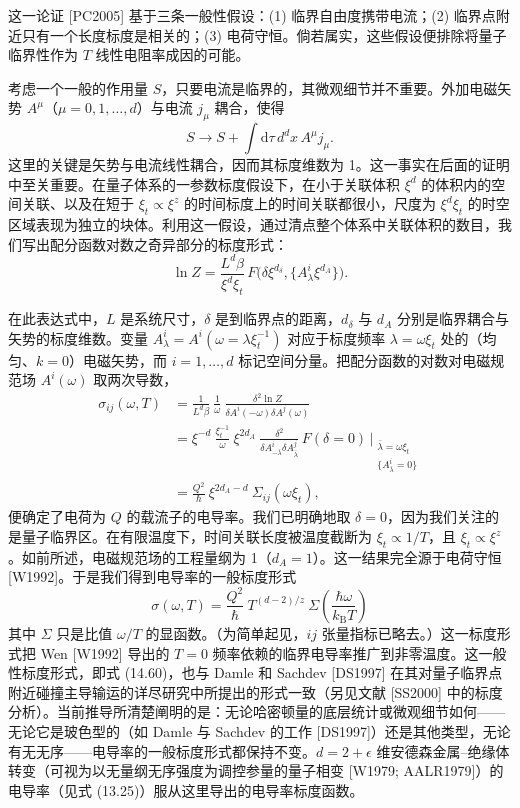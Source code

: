 这一论证 [PC2005] 基于三条一般性假设：(1) 临界自由度携带电流；(2) 临界点附近只有一个长度标度是相关的；(3) 电荷守恒。倘若属实，这些假设便排除将量子临界性作为 $T$ 线性电阻率成因的可能。

考虑一个一般的作用量 $S$，只要电流是临界的，其微观细节并不重要。外加电磁矢势 $A^{\mu}$（$\mu=0,1,\ldots,d$）与电流 $j_{\mu}$ 耦合，使得
\begin{equation*}
S\to S+\int \mathrm{d}\tau\, d^{d}x\, A^{\mu}j_{\mu}.\tag{14.57}
\end{equation*}
这里的关键是矢势与电流线性耦合，因而其标度维数为 1。这一事实在后面的证明中至关重要。在量子体系的一参数标度假设下，在小于关联体积 $\xi^{d}$ 的体积内的空间关联、以及在短于 $\xi_{t}\propto\xi^{z}$ 的时间标度上的时间关联都很小，尺度为 $\xi^{d}\xi_{t}$ 的时空区域表现为独立的块体。利用这一假设，通过清点整个体系中关联体积的数目，我们写出配分函数对数之奇异部分的标度形式：
\begin{equation*}
\ln Z=\frac{L^{d}\beta}{\xi^{d}\xi_{t}}\,F\bigl(\delta\xi^{d_{\delta}},\{A_{\lambda}^{i}\xi^{d_{A}}\}\bigr).\tag{14.58}
\end{equation*}

在此表达式中，$L$ 是系统尺寸，$\delta$ 是到临界点的距离，$d_{\delta}$ 与 $d_{A}$ 分别是临界耦合与矢势的标度维数。变量 $A_{\lambda}^{i}=A^{i}(\omega=\lambda\xi_{t}^{-1})$ 对应于标度频率 $\lambda=\omega\xi_{t}$ 处的（均匀、$k=0$）电磁矢势，而 $i=1,\ldots,d$ 标记空间分量。把配分函数的对数对电磁规范场 $A^{i}(\omega)$ 取两次导数，
\begin{align*}
\sigma_{ij}(\omega,T)&=\frac{1}{L^{d}\beta}\ \frac{1}{\omega}\ \frac{\delta^{2}\ln Z}{\delta A^{i}(-\omega)\delta A^{j}(\omega)}\\
&=\xi^{-d}\ \frac{\xi_{t}^{-1}}{\omega}\ \xi^{2d_{A}}\ \frac{\delta^{2}}{\delta A_{-\bar{\lambda}}^{i}\delta A_{\bar{\lambda}}^{j}}\,F(\delta=0)\,\Big|_{\substack{\bar{\lambda}=\omega\xi_{t}\\ \{A_{\bar{\lambda}}^{i}=0\}}}\\
&=\frac{Q^{2}}{\hbar}\ \xi^{2d_{A}-d}\ \Sigma_{ij}(\omega\xi_{t}),\tag{14.59}
\end{align*}
便确定了电荷为 $Q$ 的载流子的电导率。我们已明确地取 $\delta=0$，因为我们关注的是量子临界区。在有限温度下，时间关联长度被温度截断为 $\xi_{t}\propto1/T$，且 $\xi_{t}\propto\xi^{z}$。如前所述，电磁规范场的工程量纲为 1（$d_{A}=1$）。这一结果完全源于电荷守恒 [W1992]。于是我们得到电导率的一般标度形式
\begin{equation*}
\sigma(\omega,T)=\frac{Q^{2}}{\hbar}\ T^{(d-2)/z}\ \Sigma\left(\frac{\hbar\omega}{k_{\mathrm{B}}T}\right)\tag{14.60}
\end{equation*}
其中 $\Sigma$ 只是比值 $\omega/T$ 的显函数。（为简单起见，$ij$ 张量指标已略去。）这一标度形式把 Wen [W1992] 导出的 $T=0$ 频率依赖的临界电导率推广到非零温度。这一般性标度形式，即式 (14.60)，也与 Damle 和 Sachdev [DS1997] 在其对量子临界点附近碰撞主导输运的详尽研究中所提出的形式一致（另见文献 [SS2000] 中的标度分析）。当前推导所清楚阐明的是：无论哈密顿量的底层统计或微观细节如何——无论它是玻色型的（如 Damle 与 Sachdev 的工作 [DS1997]）还是其他类型，无论有无无序——电导率的一般标度形式都保持不变。$d=2+\epsilon$ 维安德森金属–绝缘体转变（可视为以无量纲无序强度为调控参量的量子相变 [W1979; AALR1979]）的电导率（见式 (13.25)）服从这里导出的电导率标度函数。

